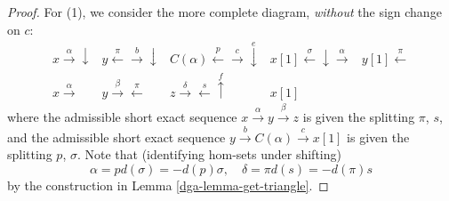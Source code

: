 \begin{proof}

For (1), we consider the more complete diagram, \emph{without} the
sign change on $c$:
$$
\begin{array}{ccccc}x\overset{\alpha}{\longrightarrow}\downarrow & y\overset{\pi}{\longleftarrow}\overset{b}{\longrightarrow}\downarrow & C(\alpha)\overset{p}{\longleftarrow}\overset{c}{\longrightarrow}\overset{e}{\downarrow} & x[1]\overset{\sigma}{\longleftarrow}\downarrow\overset{\alpha}{\longrightarrow} & y[1]\overset{\pi}{\longleftarrow} \\ x\overset{\alpha}{\longrightarrow} & y\overset{\beta}{\longrightarrow}\overset{\pi}{\longleftarrow} & z\overset{\delta}{\longrightarrow}\overset{s}{\longleftarrow}\overset{f}{\uparrow} & x[1] & \end{array}
$$
where the admissible short exact sequence
$x\xrightarrow{\alpha} y\xrightarrow{\beta} z$
is given the splitting $\pi$, $s$, and the admissible short exact sequence
$y\xrightarrow{b}C(\alpha)\xrightarrow{c}x[1]$ is given the splitting
$p$, $\sigma$. Note that (identifying hom-sets under shifting)
$$
\alpha = pd(\sigma) = -d(p)\sigma,\quad
\delta = \pi d(s) = -d(\pi)s
$$
by the construction in Lemma \ref{dga-lemma-get-triangle}.


\end{proof}
